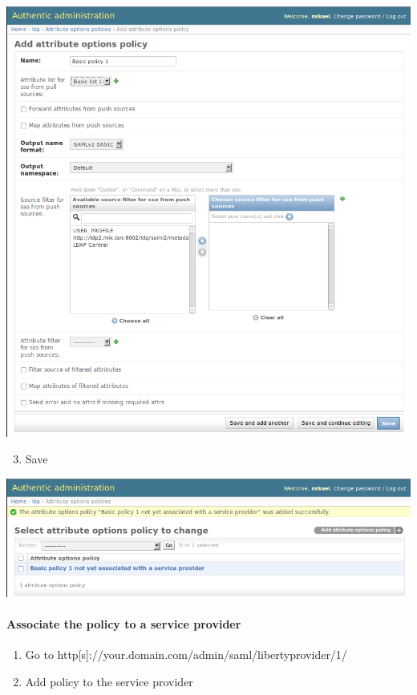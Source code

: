 \documentclass[letterpaper,10pt,english]{sphinxmanual}
\begin{document}
\includegraphics{policy_pull.png}
\begin{enumerate}
\setcounter{enumi}{2}
\item {} 
Save

\end{enumerate}

\includegraphics{policy_pull_saved.png}


\paragraph{Associate the policy to a service provider}
\label{attribute_management:associate-the-policy-to-a-service-provider}\begin{enumerate}
\item {} 
Go to http{[}s{]}://your.domain.com/admin/saml/libertyprovider/1/

\item {} 
Add policy to the service provider

\end{enumerate}
\end{document}
